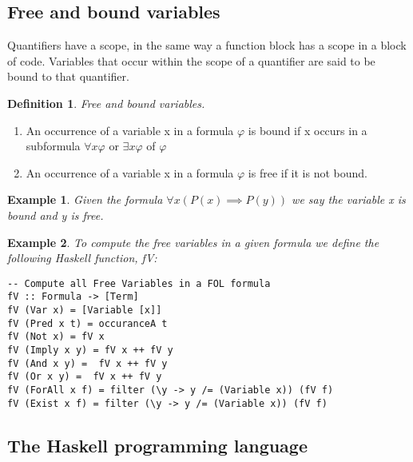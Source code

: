 \documentclass{article}%
\newtheorem{definition}{Definition}
\newtheorem{exmp}{Example}[section]
\begin{document}
\subsection{Free and bound variables}
Quantifiers have a scope, in the same way a function block has a scope in a block of code. Variables that occur within the scope of a quantifier are said to be bound to that quantifier. 
\begin{definition}
Free and bound variables. 
\end{definition}
\begin{enumerate}
\item An occurrence of a variable x in a formula $\varphi$ is bound if x occurs in a subformula $\forall{x}\varphi$ or $\exists{x}\varphi$ of $\varphi$ \cite{struth_2019}
\item An occurrence of a variable x in a formula $\varphi$ is free if it is not bound. \cite{struth_2019}
\end{enumerate}
\begin{exmp}
Given the formula $\forall{x}(P(x) \implies P(y))$ we say the variable x is bound and y is free. 
\end{exmp}
\begin{exmp}
To compute the free variables in a given formula we define the following Haskell function, fV: 
\end{exmp}
\begin{verbatim}
-- Compute all Free Variables in a FOL formula
fV :: Formula -> [Term]
fV (Var x) = [Variable [x]]
fV (Pred x t) = occuranceA t
fV (Not x) = fV x
fV (Imply x y) = fV x ++ fV y
fV (And x y) =  fV x ++ fV y
fV (Or x y) =  fV x ++ fV y
fV (ForAll x f) = filter (\y -> y /= (Variable x)) (fV f)
fV (Exist x f) = filter (\y -> y /= (Variable x)) (fV f)
\end{verbatim}
\subsection{The Haskell programming language}
\end{document}
